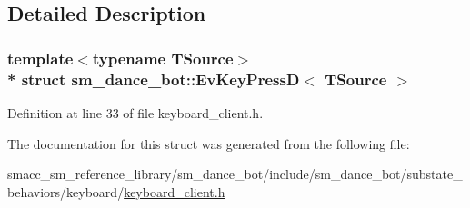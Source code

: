 \subsection{Detailed Description}
\subsubsection*{template$<$typename T\+Source$>$\\*
struct sm\+\_\+dance\+\_\+bot\+::\+Ev\+Key\+Press\+D$<$ T\+Source $>$}



Definition at line 33 of file keyboard\+\_\+client.\+h.



The documentation for this struct was generated from the following file\+:\begin{DoxyCompactItemize}
\item 
smacc\+\_\+sm\+\_\+reference\+\_\+library/sm\+\_\+dance\+\_\+bot/include/sm\+\_\+dance\+\_\+bot/substate\+\_\+behaviors/keyboard/\hyperlink{keyboard__client_8h}{keyboard\+\_\+client.\+h}\end{DoxyCompactItemize}
